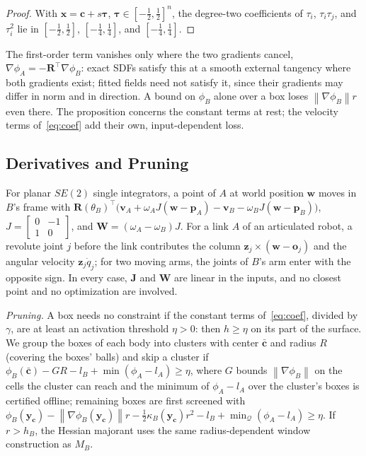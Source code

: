\documentclass[journal]{IEEEtran}
\theoremstyle{definition}
\newcommand{\norm}[1]{\left\lVert #1\right\rVert}
\newcommand{\Rot}{\mathbf{R}}
\begin{document}
\begin{proof}
With $\mathbf x=\mathbf c+s\boldsymbol\tau$, $\boldsymbol\tau\in[-\frac12,\frac12]^n$, the degree-two
coefficients of $\tau_i$, $\tau_i\tau_j$, and $\tau_i^2$ lie in $[-\frac12,\frac12]$,
$[-\frac14,\frac14]$, and $[-\frac14,\frac14]$.
\end{proof}
The first-order term vanishes only where the two gradients cancel, $\nabla\phi_A=-\Rot^\top\nabla\phi_B$:
exact SDFs satisfy this at a smooth external tangency where both gradients exist; fitted fields
need not satisfy it, since
their gradients may differ in norm and in direction. A bound on $\phi_B$ alone over a box loses
$\norm{\nabla\phi_B}r$ even there. The proposition concerns the constant terms at rest; the velocity
terms of~\eqref{eq:coef} add their own, input-dependent loss.

\subsection{Derivatives and Pruning}\label{sec:cover-der}
For planar $SE(2)$ single integrators, a point of $A$ at world position $\mathbf w$ moves in $B$'s frame
with $\Rot(\theta_B)^{\!\top}\big(\mathbf v_A+\omega_AJ(\mathbf w-\mathbf p_A)-\mathbf v_B-\omega_BJ(\mathbf w-\mathbf p_B)\big)$,
$J=\left[\begin{smallmatrix}0&-1\\1&0\end{smallmatrix}\right]$, and
$\mathbf W=(\omega_A-\omega_B)J$. For a link $A$ of an articulated robot, a revolute joint $j$ before
the link contributes the column $\mathbf z_j\times(\mathbf w-\mathbf o_j)$ and the angular velocity
$\mathbf z_j\dot q_j$; for two moving arms, the joints of $B$'s arm enter with the opposite sign. In
every case, $\mathbf J$ and $\mathbf W$ are linear in the inputs, and no closest point and no
optimization are involved.

\emph{Pruning.} A box needs no constraint if the constant terms of~\eqref{eq:coef}, divided by
$\gamma$, are at least an activation threshold $\eta>0$: then $h\ge\eta$ on its part of the surface.
We group the boxes of each body into clusters with center $\bar{\mathbf c}$ and radius $R$ (covering
the boxes' balls) and skip a cluster if $\phi_B(\bar{\mathbf c})-GR-l_B+\min(\phi_A-l_A)\ge\eta$,
where $G$ bounds $\norm{\nabla\phi_B}$ on the cells the cluster can reach and the minimum of
$\phi_A-l_A$ over the cluster's boxes is certified offline; remaining boxes are first screened with
$\phi_B(\mathbf y_{\mathbf c})-\norm{\nabla\phi_B(\mathbf y_{\mathbf c})}r-\frac12\kappa_B(\mathbf y_{\mathbf c})r^2-l_B+\min_{\mathcal Q}(\phi_A-l_A)\ge\eta$.
If $r>h_B$, the Hessian majorant uses the same radius-dependent window construction as $M_B$.
\end{document}

